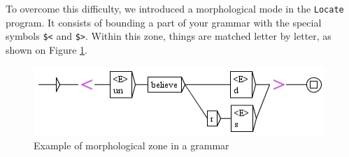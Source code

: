 \bigskip
\noindent To overcome this difficulty, we introduced a morphological mode in
the \verb$Locate$ program. It consists of bounding a part of your grammar with
the special symbols \verb+$<+ and \verb+$>+.\index{\verb+$<+}\index{\verb+$>+}
Within this zone, things are matched letter by letter, as shown on Figure
\ref{fig-morpho2}.

\begin{figure}[!ht]
\begin{center}
\includegraphics[width=11cm]{resources/img/fig6-17l.png}
\caption{Example of morphological zone in a grammar\label{fig-morpho2}}
\end{center}
\end{figure}

